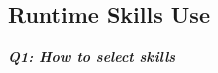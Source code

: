 \documentclass[sigconf,nonacm]{acmart}
\begin{document}


\vspace{-7pt}
\subsection{ Runtime Skills Use}

\hspace{\parindent}\emph{\textbf{Q1: How to select  skills }} %
\end{document}
